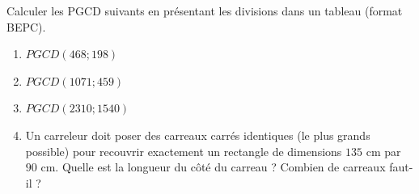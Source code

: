 \documentclass[11pt]{article}
\begin{document}
\begin{exercice}
Calculer les PGCD suivants en présentant les divisions dans un tableau (format BEPC).
\begin{enumerate}
    \item $PGCD(468; 198)$
    \item $PGCD(1071; 459)$
    \item $PGCD(2310; 1540)$
    \item Un carreleur doit poser des carreaux carrés identiques (le plus grands possible) pour recouvrir exactement un rectangle de dimensions $135$ cm par $90$ cm. Quelle est la longueur du côté du carreau ? Combien de carreaux faut-il ?
\end{enumerate}
\end{exercice}
\end{document}
